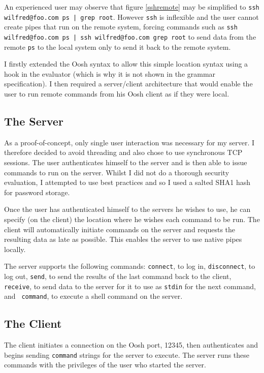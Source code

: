 \documentclass[12pt,twoside,notitlepage]{report}
\begin{document}
An experienced user may observe that figure \ref{sshremote} may be
simplified to {\tt ssh wilfred@foo.com ps | grep root}. However {\tt ssh}
is inflexible and the user cannot create pipes that run on the
remote system, forcing commands such as {\tt ssh wilfred@foo.com ps |
  ssh wilfred@foo.com grep root} to send data from the remote {\tt ps} to the
local system only to send it back to the remote system.

I firstly extended the Oosh syntax to allow this simple location
syntax using a hook in the evaluator (which is why it is not
shown in the grammar specification). I then required a server/client
architecture that would enable the user to run remote commands from
his Oosh client as if they were local.

\subsection{The Server}
As a proof-of-concept, only single user interaction was necessary for
my server. I therefore decided to avoid threading and also chose to
use synchronous TCP sessions. The user authenticates himself to the
server and is then able to issue commands to run on the server. Whilst
I did not do a thorough security evaluation, I attempted to use best
practices and so I used a salted SHA1 hash for password storage.

Once the user has authenticated himself to the servers he wishes to
use, he can specify (on the client) the location where he wishes each
command to be run. The client will automatically initiate commands on the
server and requests the resulting data as late as possible. This
enables the server to use native pipes locally.

The server supports the following commands: {\tt connect}, to log in,
{\tt disconnect}, to log out, {\tt send}, to send the results of the
last command back to the client, {\tt receive}, to send data to the
server for it to use as {\tt stdin} for the next command, and {\tt
  command}, to execute a shell command on the server.

\subsection{The Client}
The client initiates a connection on the Oosh port, 12345, then
authenticates and begins sending {\tt command} strings for the server
to execute. The server runs these commands with the privileges of the
user who started the server.
\end{document}
